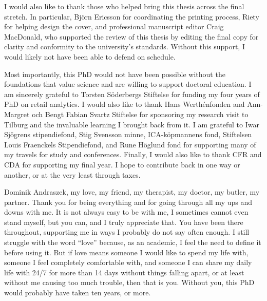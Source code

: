 I would also like to thank those who helped bring this thesis across the final stretch.
In particular, Björn Ericsson for coordinating the printing process, Riety for helping design the cover, and professional manuscript editor Craig MacDonald, who supported the review of this thesis by editing the final copy for clarity and conformity to the university’s standards. Without this support, I would likely not have been able to defend on schedule.

Most importantly, this PhD would not have been possible without the foundations that value science and are willing to support doctoral education. I am sincerely grateful to Torsten Söderbergs Stiftelse for funding my four years of PhD on retail analytics. I would also like to thank Hans Werthénfonden and Ann-Margret och Bengt Fabian Svartz Stiftelse for sponsoring my research visit to Tilburg and the invaluable learning I brought back from it. I am grateful to Iwar Sjögrens stipendiefond, Stig Svensson minne, ICA-köpmannens fond, Stiftelsen Louis Fraenckels Stipendiefond, and Rune Höglund fond for supporting many of my travels for study and conferences. Finally, I would also like to thank CFR and CDA for supporting my final year. I hope to contribute back in one way or another, or at the very least through taxes.

Dominik Andraszek, my love, my friend, my therapist, my doctor, my butler, my partner. Thank you for being everything and for going through all my ups and downs with me. It is not always easy to be with me, I sometimes cannot even stand myself, but you can, and I truly appreciate that. You have been there throughout, supporting me in ways I probably do not say often enough. I still struggle with the word “love” because, as an academic, I feel the need to define it before using it. But if love means someone I would like to spend my life with, someone I feel completely comfortable with, and someone I can share my daily life with 24/7 for more than 14 days without things falling apart, or at least without me causing too much trouble, then that is you. Without you, this PhD would probably have taken ten years, or more.